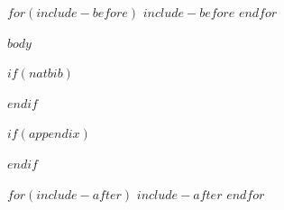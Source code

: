 \documentclass[$if(journal)$$journal$$else$water$endif$,article,submit,pdftex,moreauthors]{Definitions/mdpi}
\begin{document}
$for(include-before)$
$include-before$
$endfor$

$body$

$if(natbib)$

$endif$

$if(appendix)$
\appendix

$endif$

$for(include-after)$
$include-after$
$endfor$
\end{document}
